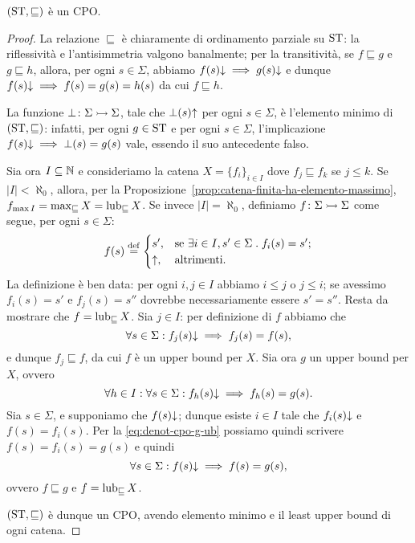 \begin{proposizione}
$(\mathrm{ST}, \sqsubseteq)$ \`e un CPO.
\end{proposizione}
\begin{proof}
La relazione $\sqsubseteq$ \`e chiaramente di ordinamento parziale su $\mathrm{ST}$:
la riflessivit\`a e l'antisimmetria  valgono banalmente;
per la transitivit\`a, se $f \sqsubseteq g$ e $g \sqsubseteq h$,
allora, per ogni $s \in \Sigma$, abbiamo $f(s)\mathord{\downarrow} \implies g(s)\mathord{\downarrow}$
e dunque $f(s)\mathord{\downarrow} \implies f(s) = g(s) = h(s)$ da cui
$f \sqsubseteq h$.

La funzione $\mathord{\bot}\colon\Sigma\rightarrowtail\Sigma$, tale che $\bot(s)\mathord{\uparrow}$
per ogni $s \in \Sigma$, \`e l'elemento minimo di $(\mathrm{ST}, \sqsubseteq)$:
infatti, per ogni $g \in \mathrm{ST}$ e per ogni $s \in \Sigma$, l'implicazione
$f(s)\mathord{\downarrow} \implies \bot(s) = g(s)$ vale, essendo il suo
antecedente falso.

Sia ora $I \subseteq \mathbb{N}$ e consideriamo la catena
$X = \{f_i\}_{i \in I}$ dove $f_j \sqsubseteq f_k$ se $j \leq k$.
Se $|I| < \aleph_0$, allora,
per la Proposizione~\ref{prop:catena-finita-ha-elemento-massimo},
$f_{\max I} = \max_{\sqsubseteq} X = \mathop{\mathrm{lub}}\nolimits_{\sqsubseteq} X$.
Se invece $|I| = \aleph_0$, definiamo $\mathord{f}\colon\Sigma\rightarrowtail\Sigma$
come segue, per ogni $s \in \Sigma$:
\[
  f(s)
    \defeq
      \begin{cases}
        s', &\text{se $\exists i \in I, s' \in \Sigma \st f_i(s) = s'$;}  \\
      \divrg, &\text{altrimenti.}
    \end{cases}
\]
La definizione \`e ben data: per ogni $i, j \in I$ abbiamo $i \leq j$
o $j \leq i$;  se avessimo $f_i(s) = s'$ e $f_j(s) = s''$ dovrebbe
necessariamente essere $s' = s''$.
Resta da mostrare che $f = \mathop{\mathrm{lub}}\nolimits_{\sqsubseteq} X$.
Sia $j \in I$: per definizione di $f$ abbiamo che
\[
  \forall s \in \Sigma \mathrel{:} f_j(s)\mathord{\downarrow} \implies f_j(s) = f(s),
\]
e dunque $f_j \sqsubseteq f$, da cui $f$ \`e un upper bound per $X$.
Sia ora $g$ un upper bound per $X$, ovvero
\begin{equation}
\label{eq:denot-cpo-g-ub}
  \forall h \in I
    \mathrel{:} \forall s \in \Sigma \mathrel{:} f_h(s)\mathord{\downarrow} \implies f_h(s) = g(s).
\end{equation}
Sia $s \in \Sigma$, e supponiamo che $f(s)\mathord{\downarrow}$;
dunque esiste $i \in I$ tale che $f_i(s)\mathord{\downarrow}$ e $f(s) = f_i(s)$.
Per la \eqref{eq:denot-cpo-g-ub} possiamo quindi scrivere
$f(s) = f_i(s) = g(s)$ e quindi
\[
  \forall s \in \Sigma \mathrel{:} f(s)\mathord{\downarrow} \implies f(s) = g(s),
\]
ovvero $f \sqsubseteq g$ e $f = \mathop{\mathrm{lub}}\nolimits_{\sqsubseteq} X$.

$(\mathrm{ST}, \sqsubseteq)$ \`e dunque un CPO, avendo elemento minimo
e il least upper bound di ogni catena.
\end{proof}

